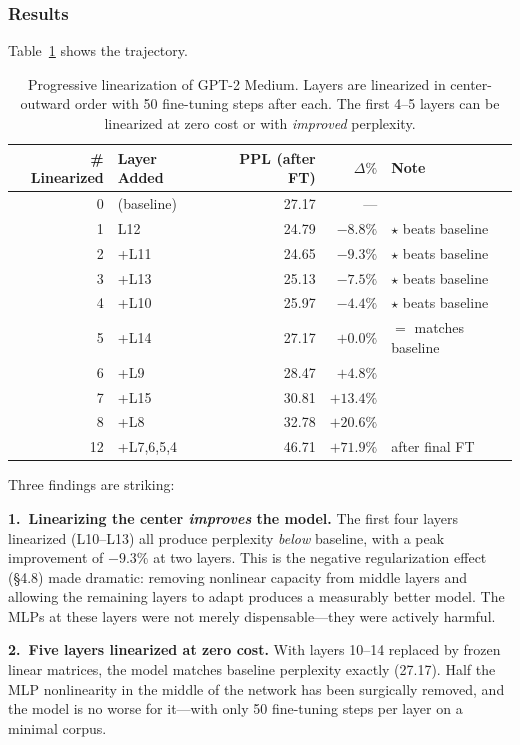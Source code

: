\documentclass[11pt]{article}
\begin{document}
\subsubsection{Results}

Table~\ref{tab:progressive} shows the trajectory.

\begin{table}[t]
\centering
\caption{Progressive linearization of GPT-2 Medium. Layers are linearized in center-outward order with 50 fine-tuning steps after each. The first 4--5 layers can be linearized at zero cost or with \textit{improved} perplexity.}
\label{tab:progressive}
\begin{tabular}{rlrrl}
\toprule
\# Linearized & Layer Added & PPL (after FT) & $\Delta\%$ & Note \\
\midrule
0 & (baseline) & 27.17 & --- & \\
1 & L12 & 24.79 & $-8.8\%$ & $\star$ beats baseline \\
2 & +L11 & 24.65 & $-9.3\%$ & $\star$ beats baseline \\
3 & +L13 & 25.13 & $-7.5\%$ & $\star$ beats baseline \\
4 & +L10 & 25.97 & $-4.4\%$ & $\star$ beats baseline \\
5 & +L14 & 27.17 & $+0.0\%$ & $=$ matches baseline \\
6 & +L9 & 28.47 & $+4.8\%$ & \\
7 & +L15 & 30.81 & $+13.4\%$ & \\
8 & +L8 & 32.78 & $+20.6\%$ & \\
\midrule
12 & +L7,6,5,4 & 46.71 & $+71.9\%$ & after final FT \\
\bottomrule
\end{tabular}
\end{table}

Three findings are striking:

\textbf{1.\ Linearizing the center \textit{improves} the model.} The first four layers linearized (L10--L13) all produce perplexity \textit{below} baseline, with a peak improvement of $-9.3\%$ at two layers. This is the negative regularization effect (\S4.8) made dramatic: removing nonlinear capacity from middle layers and allowing the remaining layers to adapt produces a measurably better model. The MLPs at these layers were not merely dispensable---they were actively harmful.

\textbf{2.\ Five layers linearized at zero cost.} With layers 10--14 replaced by frozen linear matrices, the model matches baseline perplexity exactly (27.17). Half the MLP nonlinearity in the middle of the network has been surgically removed, and the model is no worse for it---with only 50 fine-tuning steps per layer on a minimal corpus.
\end{document}
